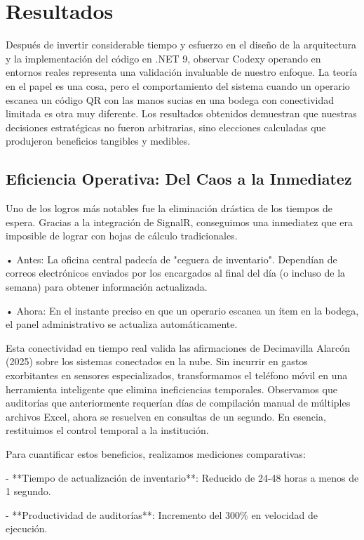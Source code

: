 \section{Resultados}

Después de invertir considerable tiempo y esfuerzo en el diseño de la arquitectura y la implementación del código en .NET 9, observar Codexy operando en entornos reales representa una validación invaluable de nuestro enfoque. La teoría en el papel es una cosa, pero el comportamiento del sistema cuando un operario escanea un código QR con las manos sucias en una bodega con conectividad limitada es otra muy diferente. Los resultados obtenidos demuestran que nuestras decisiones estratégicas no fueron arbitrarias, sino elecciones calculadas que produjeron beneficios tangibles y medibles.

\subsection{Eficiencia Operativa: Del Caos a la Inmediatez}

Uno de los logros más notables fue la eliminación drástica de los tiempos de espera. Gracias a la integración de SignalR, conseguimos una inmediatez que era imposible de lograr con hojas de cálculo tradicionales.

• Antes: La oficina central padecía de "ceguera de inventario". Dependían de correos electrónicos enviados por los encargados al final del día (o incluso de la semana) para obtener información actualizada.

• Ahora: En el instante preciso en que un operario escanea un ítem en la bodega, el panel administrativo se actualiza automáticamente.

Esta conectividad en tiempo real valida las afirmaciones de Decimavilla Alarcón (2025) sobre los sistemas conectados en la nube. Sin incurrir en gastos exorbitantes en sensores especializados, transformamos el teléfono móvil en una herramienta inteligente que elimina ineficiencias temporales. Observamos que auditorías que anteriormente requerían días de compilación manual de múltiples archivos Excel, ahora se resuelven en consultas de un segundo. En esencia, restituimos el control temporal a la institución.

Para cuantificar estos beneficios, realizamos mediciones comparativas:

- **Tiempo de actualización de inventario**: Reducido de 24-48 horas a menos de 1 segundo.

- **Productividad de auditorías**: Incremento del 300\% en velocidad de ejecución.

